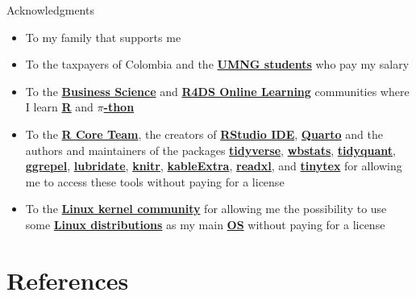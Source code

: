 \documentclass[
  ignorenonframetext,
]{beamer}
\begin{document}
\begin{frame}{Acknowledgments}
\begin{itemize}
\item
  To my family that supports me
\item
  To the taxpayers of Colombia and the
  \href{https://www.umng.edu.co/estudiante}{\textbf{UMNG students}} who
  pay my salary
\item
  To the \href{https://www.business-science.io/}{\textbf{Business
  Science}} and \href{https://www.rfordatasci.com/}{\textbf{R4DS Online
  Learning}} communities where I learn
  \href{https://www.r-project.org/about.html}{\textbf{R}} and
  \href{https://www.python.org/about/}{\textbf{\(\pi\)-thon}}
\item
  To the \href{https://www.r-project.org/contributors.html}{\textbf{R
  Core Team}}, the creators of
  \href{https://rstudio.com/products/rstudio/}{\textbf{RStudio IDE}},
  \href{https://quarto.org/}{\textbf{Quarto}} and the authors and
  maintainers of the packages
  \href{https://CRAN.R-project.org/package=tidyverse}{\textbf{tidyverse}},
  \href{https://CRAN.R-project.org/package=wbstats}{\textbf{wbstats}},
  \href{https://CRAN.R-project.org/package=tidyquant}{\textbf{tidyquant}},
  \href{https://CRAN.R-project.org/package=ggrepel}{\textbf{ggrepel}},
  \href{https://CRAN.R-project.org/package=lubridate}{\textbf{lubridate}},
  \href{https://CRAN.R-project.org/package=knitr}{\textbf{knitr}},
  \href{https://CRAN.R-project.org/package=kableExtra}{\textbf{kableExtra}},
  \href{https://CRAN.R-project.org/package=readxl}{\textbf{readxl}}, and
  \href{https://CRAN.R-project.org/package=tinytex}{\textbf{tinytex}}
  for allowing me to access these tools without paying for a license
\item
  To the \href{https://www.kernel.org/category/about.html}{\textbf{Linux
  kernel community}} for allowing me the possibility to use some
  \href{https://static.lwn.net/Distributions/}{\textbf{Linux
  distributions}} as my main
  \href{https://en.wikipedia.org/wiki/Operating_system}{\textbf{OS}}
  without paying for a license
\end{itemize}
\end{frame}

\section*{References}\label{references}
\end{document}
